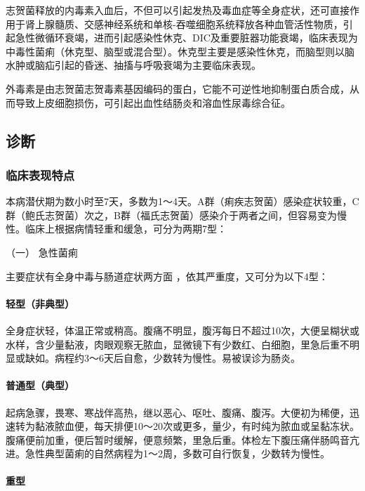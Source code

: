 志贺菌释放的内毒素入血后，不但可以引起发热及毒血症等全身症状，还可直接作用于肾上腺髓质、交感神经系统和单核-吞噬细胞系统释放各种血管活性物质，引起急性微循环衰竭，进而引起感染性休克、DIC及重要脏器功能衰竭，临床表现为中毒性菌痢（休克型、脑型或混合型）。休克型主要是感染性休克，而脑型则以脑水肿或脑疝引起的昏迷、抽搐与呼吸衰竭为主要临床表现。

外毒素是由志贺菌志贺毒素基因编码的蛋白，它能不可逆性地抑制蛋白质合成，从而导致上皮细胞损伤，可引起出血性结肠炎和溶血性尿毒综合征。

\subsection{诊断}

\subsubsection{临床表现特点}

本病潜伏期为数小时至7天，多数为1～4天。A群（痢疾志贺菌）感染症状较重，C群（鲍氏志贺菌）次之，B群（福氏志贺菌）感染介于两者之间，但容易变为慢性。临床上根据病情轻重和缓急，可分为两期7型：

\hypertarget{text00227.htmlux5cux23CHP7-9-2-1-1}{}
（一） 急性菌痢

主要症状有全身中毒与肠道症状两方面 ，依其严重度，又可分为以下4型：

\paragraph{轻型（非典型）}

全身症状轻，体温正常或稍高。腹痛不明显，腹泻每日不超过10次，大便呈糊状或水样，含少量黏液，肉眼观察无脓血，显微镜下有少数红、白细胞，里急后重不明显或缺如。病程约3～6天后自愈，少数转为慢性。易被误诊为肠炎。

\paragraph{普通型（典型）}

起病急骤，畏寒、寒战伴高热，继以恶心、呕吐、腹痛、腹泻。大便初为稀便，迅速转为黏液脓血便，每天排便10～20次或更多，量少，有时纯为脓血或呈黏冻状。腹痛便前加重，便后暂时缓解，便意频繁，里急后重。体检左下腹压痛伴肠鸣音亢进。急性典型菌痢的自然病程为1～2周，多数可自行恢复，少数转为慢性。

\paragraph{重型}


